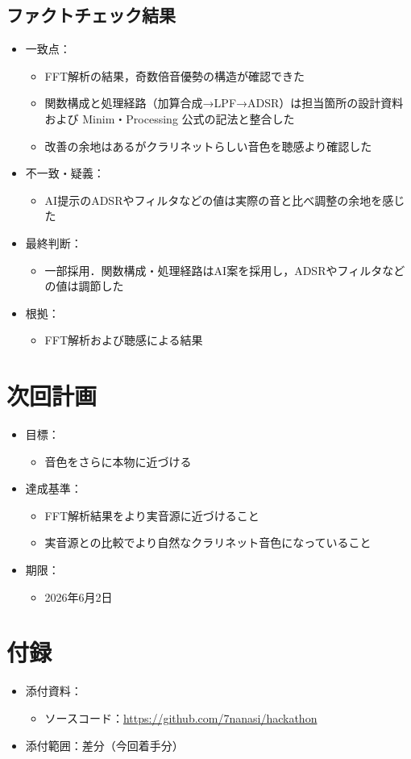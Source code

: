 \documentclass[uplatex,dvipdfmx]{jlreq}
\begin{document}
\subsection{ファクトチェック結果}
\begin{itemize}
  \item 一致点：
  \begin{itemize}
    \item FFT解析の結果，奇数倍音優勢の構造が確認できた
    \item 関数構成と処理経路（加算合成→LPF→ADSR）は担当箇所の設計資料および Minim・Processing 公式の記法と整合した
    \item 改善の余地はあるがクラリネットらしい音色を聴感より確認した
  \end{itemize}
  \item 不一致・疑義：
  \begin{itemize}
    \item AI提示のADSRやフィルタなどの値は実際の音と比べ調整の余地を感じた
  \end{itemize}
  \item 最終判断：
  \begin{itemize}
    \item 一部採用．関数構成・処理経路はAI案を採用し，ADSRやフィルタなどの値は調節した
  \end{itemize}
  \item 根拠：
  \begin{itemize}
    \item FFT解析および聴感による結果
  \end{itemize}
\end{itemize}

\section{次回計画}
\begin{itemize}
  \item 目標：
  \begin{itemize}
    \item 音色をさらに本物に近づける
  \end{itemize}
  \item 達成基準：
  \begin{itemize}
    \item FFT解析結果をより実音源に近づけること
    \item 実音源との比較でより自然なクラリネット音色になっていること
  \end{itemize}
  \item 期限：
  \begin{itemize}
    \item 2026年6月2日
  \end{itemize}
\end{itemize}

\section{付録}
\begin{itemize}
  \item 添付資料：
  \begin{itemize}
    \item ソースコード：\url{https://github.com/7nanasi/hackathon}
  \end{itemize}
  \item 添付範囲：差分（今回着手分）
\end{itemize}
\end{document}
